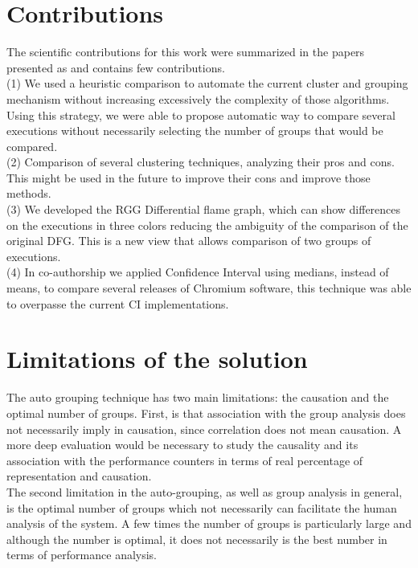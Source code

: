\section{Contributions}
The scientific contributions for this work were summarized in the papers presented as and contains few contributions. \\
(1) We used a heuristic comparison to automate the current cluster and grouping mechanism without increasing excessively the complexity of those algorithms. Using this strategy, we were able to propose automatic way to compare several executions without necessarily selecting the number of groups that would be compared.\\
(2) Comparison of several clustering techniques, analyzing their pros and cons. This might be used in the future to improve their cons and improve those methods.\\ 
(3) We developed the RGG Differential flame graph, which can show differences on the executions in three colors reducing the ambiguity of the comparison of the original DFG. This is a new view that allows comparison of two groups of executions. \\
(4) In co-authorship we applied Confidence Interval using medians, instead of means, to compare several releases of Chromium software, this technique was able to overpasse the current CI implementations.

\section{Limitations of the solution}
The auto grouping technique has two main limitations: the causation and the optimal number of groups.
First, is that association with the group analysis does not necessarily imply in causation, since correlation does not mean causation. A more deep evaluation would be necessary to study the causality and its association with the performance counters in terms of real percentage of representation and causation.\\
The second limitation in the auto-grouping, as well as group analysis in general, is the optimal number of groups which not necessarily can facilitate the human analysis of the system. A few times the number of groups is particularly large and although the number is optimal, it does not necessarily is the best number in terms of performance analysis.

